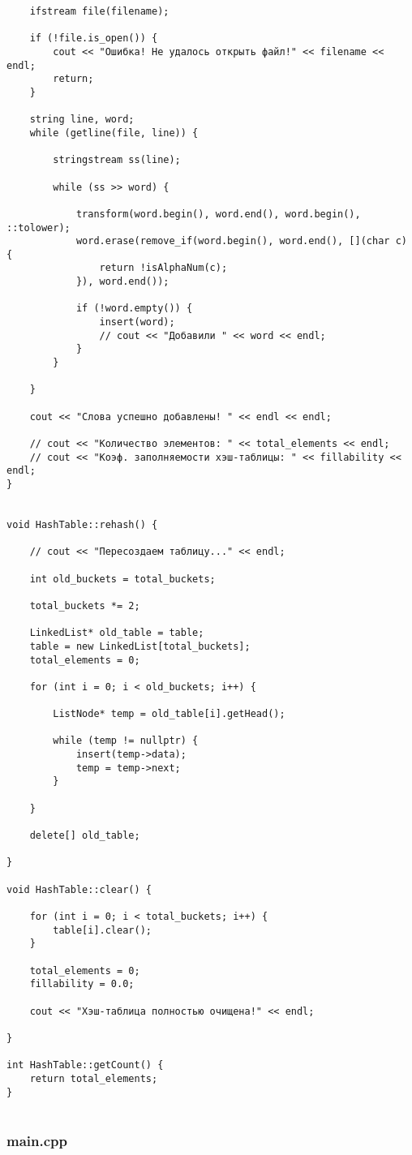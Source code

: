\documentclass[11pt,a4paper,final]{article} %
\begin{document}
\begin{lstlisting}
	ifstream file(filename);
	
	if (!file.is_open()) {
		cout << "Ошибка! Не удалось открыть файл!" << filename << endl;
		return;
	}
	
	string line, word;
	while (getline(file, line)) {
		
		stringstream ss(line);
		
		while (ss >> word) {
			
			transform(word.begin(), word.end(), word.begin(), ::tolower);
			word.erase(remove_if(word.begin(), word.end(), [](char c) {
				return !isAlphaNum(c);
			}), word.end());
			
			if (!word.empty()) { 
				insert(word);
				// cout << "Добавили " << word << endl;
			}
		}
		
	}
	
	cout << "Слова успешно добавлены! " << endl << endl;
	
	// cout << "Количество элементов: " << total_elements << endl;
	// cout << "Коэф. заполняемости хэш-таблицы: " << fillability << endl;
}


void HashTable::rehash() {
	
	// cout << "Пересоздаем таблицу..." << endl;
	
	int old_buckets = total_buckets;
	
	total_buckets *= 2;
	
	LinkedList* old_table = table; 
	table = new LinkedList[total_buckets];
	total_elements = 0;
	
	for (int i = 0; i < old_buckets; i++) {
		
		ListNode* temp = old_table[i].getHead();
		
		while (temp != nullptr) {
			insert(temp->data);
			temp = temp->next;
		}
		
	}
	
	delete[] old_table;
	
}

void HashTable::clear() {
	
	for (int i = 0; i < total_buckets; i++) {
		table[i].clear();
	}
	
	total_elements = 0;
	fillability = 0.0;
	
	cout << "Хэш-таблица полностью очищена!" << endl;
	
}

int HashTable::getCount() {
	return total_elements;
}


\end{lstlisting}

\subsubsection*{main.cpp}
\end{document}
